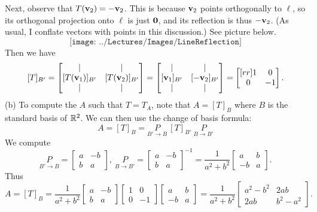 \begin{solution}
Next, observe that $T({\mathbf v}_2)=-{\mathbf v}_2$. This is because ${\mathbf v}_2$ points orthogonally to $\ell$, so its orthogonal projection onto $\ell$ is just ${\mathbf 0}$, and its reflection is thus $-{\mathbf v}_2$. (As usual, I conflate vectors with points in this discussion.) See picture below. 
\[
\texttt{[image: ../Lectures/Images/LineReflection]}
\] 
Then we have 
\[
[T]_{B'}=\begin{bmatrix} \vert &\vert \\ [T(\boldv_1)]_{B'} & [T(\boldv_2)]_{B'}\\ \vert &\vert \end{bmatrix}=\begin{bmatrix} \vert &\vert \\ [\boldv_1]_{B'} & [-\boldv_2]_{B'}\\ \vert &\vert \end{bmatrix}=\begin{bmatrix}[rr]
1&0\\
0&-1
\end{bmatrix}.
\]
(b) To compute the $A$ such that $T=T_A$, note that $A=[T]_B$ where $B$ is the standard basis of ${\mathbb R}^2$. We can then use the change of basis formula: 
\[
A=[T]_B=\underset{B'\rightarrow B}{P}\ [T]_{B'}\ \underset{B\rightarrow B'}{P}
\]
We compute 
\[
\underset{B'\rightarrow B}{P}=\begin{bmatrix}
a&-b\\
b&a
\end{bmatrix}, \ \underset{B\rightarrow B'}{P}=\begin{bmatrix}
a&-b\\
b&a
\end{bmatrix}^{-1}=\frac{1}{a^2+b^2}\begin{bmatrix}
a&b\\
-b&a
\end{bmatrix}.
\]
Thus 
\[
A=[T]_B=\frac{1}{a^2+b^2}\begin{bmatrix}
a&-b\\
b&a
\end{bmatrix}\begin{bmatrix}
1&0\\
0&-1
\end{bmatrix}
\begin{bmatrix}
a&b\\
-b&a
\end{bmatrix}
=\frac{1}{a^2+b^2}\begin{bmatrix}
a^2-b^2&2ab\\
2ab&b^2-a^2
\end{bmatrix}.
\]
\end{solution}
